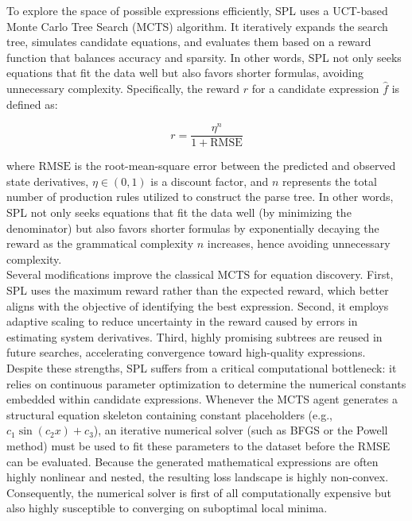 \documentclass[11pt, a4paper]{article}
\begin{document}
To explore the space of possible expressions efficiently, SPL uses a UCT-based Monte Carlo Tree Search (MCTS) algorithm. It iteratively expands the search tree, simulates candidate equations, and evaluates them based on a reward function that balances accuracy and sparsity. In other words, SPL not only seeks equations that fit the data well but also favors shorter formulas, avoiding unnecessary complexity. Specifically, the reward $r$ for a candidate expression $\hat{f}$ is defined as:

\begin{equation}
    r = \frac{\eta^n}{1 + \text{RMSE}}
\end{equation}

where $\text{RMSE}$ is the root-mean-square error between the predicted and observed state derivatives, $\eta \in (0,1)$ is a discount factor, and $n$ represents the total number of production rules utilized to construct the parse tree. In other words, SPL not only seeks equations that fit the data well (by minimizing the denominator) but also favors shorter formulas by exponentially decaying the reward as the grammatical complexity $n$ increases, hence avoiding unnecessary complexity.\\

Several modifications improve the classical MCTS for equation discovery. First, SPL uses the maximum reward rather than the expected reward, which better aligns with the objective of identifying the best expression. Second, it employs adaptive scaling to reduce uncertainty in the reward caused by errors in estimating system derivatives. Third, highly promising subtrees are reused in future searches, accelerating convergence toward high-quality expressions.\\

Despite these strengths, SPL suffers from a critical computational bottleneck: it relies on continuous parameter optimization to determine the numerical constants embedded within candidate expressions. Whenever the MCTS agent generates a structural equation skeleton containing constant placeholders (e.g., $c_1 \sin(c_2 x) + c_3$), an iterative numerical solver (such as BFGS or the Powell method) must be used to fit these parameters to the dataset before the RMSE can be evaluated. Because the generated mathematical expressions are often highly nonlinear and nested, the resulting loss landscape is highly non-convex. Consequently, the numerical solver is first of all computationally expensive but also highly susceptible to converging on suboptimal local minima. 
\end{document}
